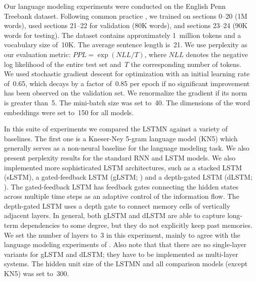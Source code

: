 \documentclass[11pt,letterpaper]{article}
\begin{document}
	
	Our language modeling experiments were conducted on the
        English Penn Treebank dataset. Following common practice
        \cite{mikolov2010recurrent}, we trained on sections 0--20 (1M
        words), used sections 21--22 for validation (80K words), and
        sections 23--24 (90K words for testing). The dataset contains
        approximately 1~million tokens and a vocabulary size
        of~10K. The average sentence length is~21.
We use perplexity as our evaluation metric: \mbox{$PPL =
          \exp(NLL/T)$}, where $NLL$ denotes the negative log
        likelihood of the entire test set and~$T$ the corresponding
        number of tokens. We used stochastic gradient descent for
        optimization with an initial learning rate of~0.65, which
        decays by a factor of~0.85 per epoch if no significant
        improvement has been observed on the validation set. We
        renormalize the gradient if its norm is greater than~5. The
        \mbox{mini-batch} size was set to~40. The dimensions of the
        word embeddings were set to~150 for all models.


	In this suite of experiments we compared the LSTMN against a
        variety of baselines. The first one is a Kneser-Ney 5-gram
        language model (KN5) which generally serves as a non-neural
        baseline for the language modeling task. We also present
        perplexity results for the standard RNN and LSTM models. We
        also implemented more sophisticated LSTM architectures, such
        as a stacked LSTM (sLSTM), a gated-feedback LSTM (gLSTM;
        ) and a depth-gated LSTM (dLSTM;
        ). The gated-feedback LSTM has feedback
        gates connecting the hidden states across multiple time steps
        as an adaptive control of the information flow. The
        depth-gated LSTM uses a depth gate to connect memory cells of
        vertically adjacent layers. In general, both gLSTM and
        \mbox{dLSTM} are able to capture long-term dependencies to
        some degree, but they do not explicitly keep past memories.
        We set the number of layers to~3 in this experiment, mainly to
        agree with the language modeling experiments of
        . Also note that that there are no
        single-layer variants for gLSTM and dLSTM; they have to
        be implemented as multi-layer systems. The hidden unit size of
        the LSTMN and all comparison models (except KN5) was set
        to~300.
\end{document}
